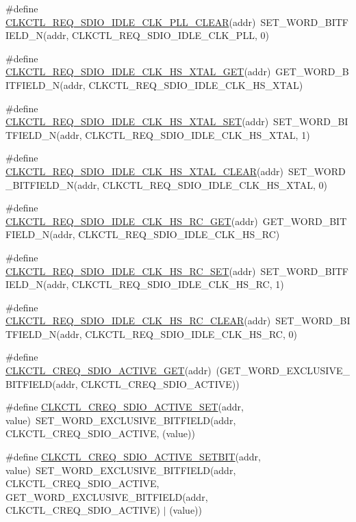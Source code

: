 \begin{DoxyCompactItemize}
\item 
\#define \hyperlink{a00544_a8a4ea6ab0c19ea65697eb85adb7de4a2}{CLKCTL\_\-REQ\_\-SDIO\_\-IDLE\_\-CLK\_\-PLL\_\-CLEAR}(addr)~SET\_\-WORD\_\-BITFIELD\_\-N(addr, CLKCTL\_\-REQ\_\-SDIO\_\-IDLE\_\-CLK\_\-PLL, 0)
\item 
\#define \hyperlink{a00544_a225bddc6946a497a684f6f2d8e599ca0}{CLKCTL\_\-REQ\_\-SDIO\_\-IDLE\_\-CLK\_\-HS\_\-XTAL\_\-GET}(addr)~GET\_\-WORD\_\-BITFIELD\_\-N(addr, CLKCTL\_\-REQ\_\-SDIO\_\-IDLE\_\-CLK\_\-HS\_\-XTAL)
\item 
\#define \hyperlink{a00544_a68c797f86f642229b8f58daf1cb6ee31}{CLKCTL\_\-REQ\_\-SDIO\_\-IDLE\_\-CLK\_\-HS\_\-XTAL\_\-SET}(addr)~SET\_\-WORD\_\-BITFIELD\_\-N(addr, CLKCTL\_\-REQ\_\-SDIO\_\-IDLE\_\-CLK\_\-HS\_\-XTAL, 1)
\item 
\#define \hyperlink{a00544_af95171432ea5b991bdf081ad6d981f5e}{CLKCTL\_\-REQ\_\-SDIO\_\-IDLE\_\-CLK\_\-HS\_\-XTAL\_\-CLEAR}(addr)~SET\_\-WORD\_\-BITFIELD\_\-N(addr, CLKCTL\_\-REQ\_\-SDIO\_\-IDLE\_\-CLK\_\-HS\_\-XTAL, 0)
\item 
\#define \hyperlink{a00544_a107268569fdc6da0452b38c0dbbe2cc8}{CLKCTL\_\-REQ\_\-SDIO\_\-IDLE\_\-CLK\_\-HS\_\-RC\_\-GET}(addr)~GET\_\-WORD\_\-BITFIELD\_\-N(addr, CLKCTL\_\-REQ\_\-SDIO\_\-IDLE\_\-CLK\_\-HS\_\-RC)
\item 
\#define \hyperlink{a00544_ab670bdf408e1228bdcc5a41011040ad2}{CLKCTL\_\-REQ\_\-SDIO\_\-IDLE\_\-CLK\_\-HS\_\-RC\_\-SET}(addr)~SET\_\-WORD\_\-BITFIELD\_\-N(addr, CLKCTL\_\-REQ\_\-SDIO\_\-IDLE\_\-CLK\_\-HS\_\-RC, 1)
\item 
\#define \hyperlink{a00544_ad2e0326178a41b19eccb0d0a4fb6a26a}{CLKCTL\_\-REQ\_\-SDIO\_\-IDLE\_\-CLK\_\-HS\_\-RC\_\-CLEAR}(addr)~SET\_\-WORD\_\-BITFIELD\_\-N(addr, CLKCTL\_\-REQ\_\-SDIO\_\-IDLE\_\-CLK\_\-HS\_\-RC, 0)
\item 
\#define \hyperlink{a00544_a55e5958f84611990086185cb85f7e67c}{CLKCTL\_\-CREQ\_\-SDIO\_\-ACTIVE\_\-GET}(addr)~(GET\_\-WORD\_\-EXCLUSIVE\_\-BITFIELD(addr, CLKCTL\_\-CREQ\_\-SDIO\_\-ACTIVE))
\item 
\#define \hyperlink{a00544_a10060e70de510a7bf8e7e75380c7e02d}{CLKCTL\_\-CREQ\_\-SDIO\_\-ACTIVE\_\-SET}(addr, value)~SET\_\-WORD\_\-EXCLUSIVE\_\-BITFIELD(addr, CLKCTL\_\-CREQ\_\-SDIO\_\-ACTIVE, (value))
\item 
\#define \hyperlink{a00544_a23f0b49a577f4bdf573ced3ad97459ad}{CLKCTL\_\-CREQ\_\-SDIO\_\-ACTIVE\_\-SETBIT}(addr, value)~SET\_\-WORD\_\-EXCLUSIVE\_\-BITFIELD(addr, CLKCTL\_\-CREQ\_\-SDIO\_\-ACTIVE, GET\_\-WORD\_\-EXCLUSIVE\_\-BITFIELD(addr, CLKCTL\_\-CREQ\_\-SDIO\_\-ACTIVE) $|$ (value))

\end{DoxyCompactItemize}
